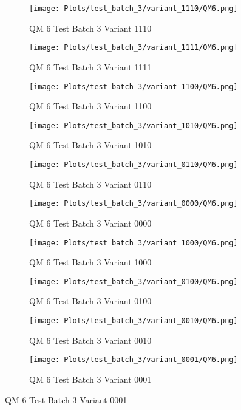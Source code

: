 \documentclass{DissertateFigs}
\begin{document}
\begin{figure}[t!]
    \begin{subfigure}{0.47\textwidth}
    \texttt{[image: Plots/test\_batch\_3/variant\_1110/QM6.png]}
    \caption{QM 6 Test Batch 3 Variant 1110}
    \end{subfigure}
    \begin{subfigure}{0.47\textwidth}
    \texttt{[image: Plots/test\_batch\_3/variant\_1111/QM6.png]}
    \caption{QM 6 Test Batch 3 Variant 1111}
    \end{subfigure}

\medskip

    \begin{subfigure}{0.47\textwidth}
    \texttt{[image: Plots/test\_batch\_3/variant\_1100/QM6.png]}
    \caption{QM 6 Test Batch 3 Variant 1100}
    \end{subfigure}
    \begin{subfigure}{0.47\textwidth}
    \texttt{[image: Plots/test\_batch\_3/variant\_1010/QM6.png]}
    \caption{QM 6 Test Batch 3 Variant 1010}
    \end{subfigure}

\medskip

    \begin{subfigure}{0.47\textwidth}
    \texttt{[image: Plots/test\_batch\_3/variant\_0110/QM6.png]}
    \caption{QM 6 Test Batch 3 Variant 0110}
    \end{subfigure}
    \begin{subfigure}{0.47\textwidth}
    \texttt{[image: Plots/test\_batch\_3/variant\_0000/QM6.png]}
    \caption{QM 6 Test Batch 3 Variant 0000}
    \end{subfigure}

\medskip

    \begin{subfigure}{0.47\textwidth}
    \texttt{[image: Plots/test\_batch\_3/variant\_1000/QM6.png]}
    \caption{QM 6 Test Batch 3 Variant 1000}
    \end{subfigure}
    \begin{subfigure}{0.47\textwidth}
    \texttt{[image: Plots/test\_batch\_3/variant\_0100/QM6.png]}
    \caption{QM 6 Test Batch 3 Variant 0100}
    \end{subfigure}

\medskip

    \begin{subfigure}{0.47\textwidth}
    \texttt{[image: Plots/test\_batch\_3/variant\_0010/QM6.png]}
    \caption{QM 6 Test Batch 3 Variant 0010}
    \end{subfigure}
    \begin{subfigure}{0.47\textwidth}
    \texttt{[image: Plots/test\_batch\_3/variant\_0001/QM6.png]}
    \caption{QM 6 Test Batch 3 Variant 0001}
    \end{subfigure}


\end{figure}
\end{document}
